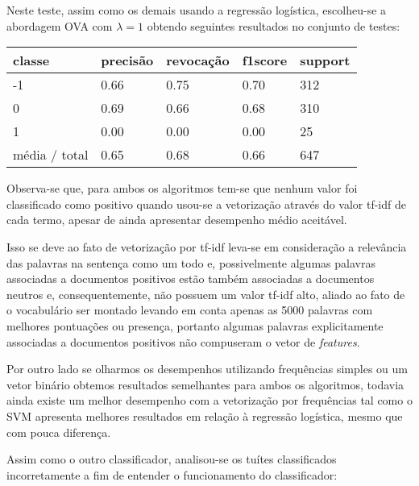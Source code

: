 Neste teste, assim como os demais usando a regressão logística, escolheu-se a abordagem OVA com
$\lambda = 1$ obtendo seguintes resultados no conjunto de testes:

\begin{table}[H]
	\centering
		\begin{tabular}{l | l | l | l | l}
		\hline
		classe  	&	precisão  &  revocação &  f1\-score &  support \\
		\hline
		 -1    &   0.66   &   0.75   &   0.70   &    312 \\
		 \hline
          0    &   0.69   &   0.66   &   0.68   &    310 \\
          \hline
          1    &   0.00   &   0.00   &   0.00    &    25 \\
		\hline
		média / total   &    0.65   &   0.68   &   0.66   &    647 \\
		\hline
	\end{tabular}
\end{table}

Observa-se que, para ambos os algoritmos tem-se que nenhum valor foi classificado como
positivo quando usou-se a vetorização através do valor tf-idf de cada termo, apesar de ainda
apresentar desempenho médio aceitável. 

Isso se deve ao fato de vetorização por tf-idf
leva-se em consideração a relevância das palavras na sentença como um todo e, possivelmente
algumas palavras associadas a documentos positivos estão também associadas
a documentos neutros e, consequentemente, não possuem um valor tf-idf alto, aliado ao fato de o vocabulário
ser montado levando em conta apenas as 5000 palavras com melhores pontuações ou presença, portanto
algumas palavras explicitamente associadas a documentos positivos não compuseram o vetor de
\textit{features}.

Por outro lado se olharmos os desempenhos utilizando frequências simples ou um vetor binário
obtemos resultados semelhantes para ambos os algoritmos, todavia ainda existe um melhor desempenho
com a vetorização por frequências tal como o SVM apresenta melhores resultados em relação à regressão
logística, mesmo que com pouca diferença.

Assim como o outro classificador, analisou-se os tuítes classificados incorretamente a fim de
entender o funcionamento do classificador:

